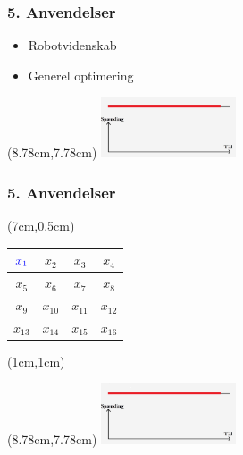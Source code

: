 \documentclass[10pt,notheorems,xcolor=pdftex,dvipsnames,table]{beamer}
\renewcommand{\{}{\left\lbrace}
\renewcommand{\}}{\right\rbrace}
\begin{document}
\begin{frame}[t]
\frametitle{
		\LARGE{5. Anvendelser}}
					\begin{itemize}
					\item Robotvidenskab
					\item Generel optimering
					\end{itemize} 
				\begin{textblock*}{0.1cm}(8.78cm,7.78cm)  
					\includegraphics[width=4cm]{disposition/d19.jpg}
				\end{textblock*}	
\end{frame}



\begin{frame}[t]
\frametitle{
		\LARGE{5. Anvendelser}}
\begin{textblock*}{5cm}(7cm,0.5cm)
\begin{table} 
\begin{tabular}{|c|c||c|c|} 
\hline
${\color{blue}x_1}$ & $x_2$ & $x_3$ & $x_4$\\
\hline
$x_5$ & $x_6$ & $x_7$ & $x_8$ \\
\hline\hline
$x_9$ & $x_{10}$ & $x_{11}$ & $x_{12}$\\
\hline
$x_{13}$ & $x_{14}$ & $x_{15}$ & $x_{16}$\\
\hline
\end{tabular} 
\end{table}
\end{textblock*}
\begin{textblock*}{0.1cm}(1cm,1cm)
\end{textblock*}
				\begin{textblock*}{0.1cm}(8.78cm,7.78cm)  
					\includegraphics[width=4cm]{disposition/d19.jpg}
				\end{textblock*}	
\end{frame}
\end{document}
